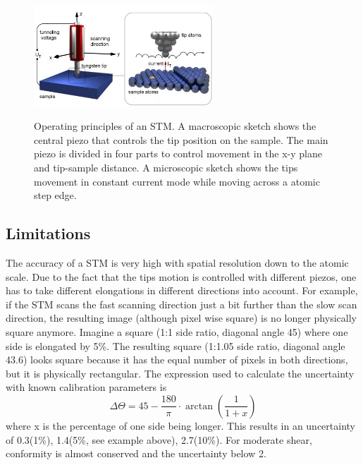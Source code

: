 \begin{figure}\centering
	
\includegraphics[width=0.6\textwidth]{./images/stm-rutgers-modified.jpg}
\label{fig:STM-tip}

	\caption{Operating principles of an STM. A macroscopic sketch  shows the central piezo that controls the tip position on the sample. The main piezo is divided in four parts to control movement in the x-y plane and tip-sample distance\cite{STM-rutgers}. A microscopic sketch shows the tips movement in constant current mode while moving across a atomic step edge.}
	\label{fig:STM-sketch}
\end{figure}

\subsection{Limitations}The accuracy of a STM is very high with spatial resolution down to the atomic scale. Due to the fact that the tips motion is controlled with different piezos, one has to take different elongations in different directions into account. For example, if the STM scans the fast scanning direction just a bit further than the slow scan direction, the resulting image (although pixel wise square) is no longer physically square anymore. Imagine a square (1:1 side ratio, diagonal angle 45\textdegree) where one side is elongated by 5\%. The resulting square (1:1.05 side ratio, diagonal angle 43.6\textdegree) looks square because it has the equal number of pixels in both directions, but it is physically rectangular. The expression used to calculate the uncertainty with known calibration parameters is
$$\Delta \Theta = 45 - \frac{180}{\pi}\cdot\arctan(\frac{1}{1+x})$$ where x is the percentage of one side being longer. This results in an uncertainty of 0.3\textdegree(1\%), 1.4\textdegree(5\%, see example above), 2.7\textdegree(10\%). For moderate shear, conformity is almost conserved and the uncertainty below 2\textdegree.

